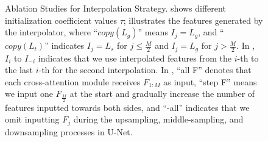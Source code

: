 \begin{figure}[h]
\centering
{}
\hfill
{}
\vfill
{}
\hfill
{}
\caption{Ablation Studies for Interpolation Strategy.  shows different initialization coefficient values $\tau$;  illustrates the features generated by the interpolator, where ``$copy(L_g)$'' means $I_j = L_g$, and ``$copy(L_t)$'' indicates $I_j = L_s$ for $j \leq \frac{M}{2}$ and $I_j = L_g$ for $j > \frac{M}{2}$. In , $I_i$ to $I_{-i}$ indicates that we use interpolated features from the $i$-th to the last $i$-th for the second interpolation. In , ``all F'' denotes that each cross-attention module receives $F_{1:M}$ as input, ``step F'' means we input one $F_{\frac{M}{2}}$ at the start and gradually increase the number of features inputted towards both sides, and ``-all'' indicates that we omit inputting $F_j$ during the upsampling, middle-sampling, and downsampling processes in U-Net. }
\label{fig:four_images2}
\end{figure}